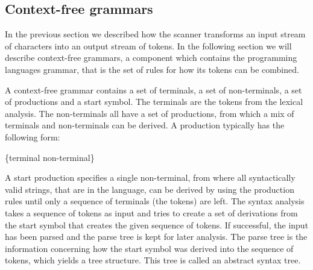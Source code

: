 \subsection{Context-free grammars}
\label{sec:context-freegrammars}

In the previous section we described how the scanner transforms an input stream
of characters into an output stream of tokens. In the following section we will
describe context-free grammars, a component which contains the programming
languages grammar, that is the set of rules for how its tokens can be combined.

A context-free grammar contains a set of terminals, a set of non-terminals, a
set of productions and a start symbol. The terminals are the tokens from the
lexical analysis. The non-terminals all have a set of productions, from which a
mix of terminals and non-terminals can be derived. A production typically
has the following form:

\begin{ebnf}
 {\{terminal \gor \gcat non-terminal\}}
\end{ebnf}

A start production specifies a single non-terminal, from where all syntactically
valid strings, that are in the language, can be derived by using the
production rules until only a sequence of terminals (the tokens) are left. The
syntax analysis takes a sequence of tokens as input and tries to create a set of
derivations from the start symbol that creates the given sequence of tokens. If
successful, the input has been parsed and the parse tree is kept for later
analysis. The parse tree is the information concerning how the start symbol was
derived into the sequence of tokens, which yields a tree structure. This tree
is called an abstract syntax tree.

